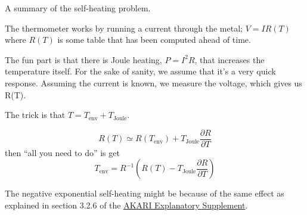 \documentclass[notitlepage]{report}
\begin{document}
A summary of the self-heating problem.

The thermometer works by running a current through the metal; $V=IR(T)$ where $R(T)$ is some table that has been computed ahead of time.

The fun part is that there is Joule heating, $P=I^{2}R$, that increases the temperature itself. For the sake of sanity, we assume that it's a very quick response. Assuming the current is known, we measure the voltage, which gives us R(T). 

The trick is that $T=T_{\mathrm{env}}+T_{\mathrm{Joule}}$. 

\[
R(T)\simeq R(T_{\mathrm{env}})+T_{\mathrm{Joule}}\frac{\partial R}{\partial T}
\]
then ``all you need to do'' is get
\[
T_{\mathrm{env}}=R^{-1}\left(R(T)-T_{\mathrm{Joule}}\frac{\partial R}{\partial T}\right)
\]

The negative exponential self-heating might be because of the same effect as explained in section 3.2.6 of the \href{https://www.ir.isas.jaxa.jp/AKARI/Observation/support/FIS/IDUM/FIS_IDUM_1.3.pdf}{AKARI Explanatory Supplement}.
\end{document}
